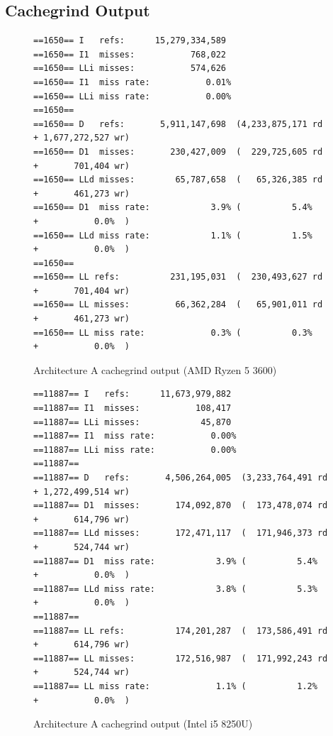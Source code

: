 \documentclass{article}
\begin{document}
\subsection{Cachegrind Output}
\begin{figure}[!h]
\centering
\begin{BVerbatim}
==1650== I   refs:      15,279,334,589
==1650== I1  misses:           768,022
==1650== LLi misses:           574,626
==1650== I1  miss rate:           0.01%
==1650== LLi miss rate:           0.00%
==1650== 
==1650== D   refs:       5,911,147,698  (4,233,875,171 rd   + 1,677,272,527 wr)
==1650== D1  misses:       230,427,009  (  229,725,605 rd   +       701,404 wr)
==1650== LLd misses:        65,787,658  (   65,326,385 rd   +       461,273 wr)
==1650== D1  miss rate:            3.9% (          5.4%     +           0.0%  )
==1650== LLd miss rate:            1.1% (          1.5%     +           0.0%  )
==1650== 
==1650== LL refs:          231,195,031  (  230,493,627 rd   +       701,404 wr)
==1650== LL misses:         66,362,284  (   65,901,011 rd   +       461,273 wr)
==1650== LL miss rate:             0.3% (          0.3%     +           0.0%  )
\end{BVerbatim}
\caption{Architecture A cachegrind output (AMD Ryzen 5 3600)}
\label{arch_a_cachegrind_pc}
\end{figure}

\begin{figure}[!h]
\centering
\begin{BVerbatim}
==11887== I   refs:      11,673,979,882
==11887== I1  misses:           108,417
==11887== LLi misses:            45,870
==11887== I1  miss rate:           0.00%
==11887== LLi miss rate:           0.00%
==11887== 
==11887== D   refs:       4,506,264,005  (3,233,764,491 rd   + 1,272,499,514 wr)
==11887== D1  misses:       174,092,870  (  173,478,074 rd   +       614,796 wr)
==11887== LLd misses:       172,471,117  (  171,946,373 rd   +       524,744 wr)
==11887== D1  miss rate:            3.9% (          5.4%     +           0.0%  )
==11887== LLd miss rate:            3.8% (          5.3%     +           0.0%  )
==11887== 
==11887== LL refs:          174,201,287  (  173,586,491 rd   +       614,796 wr)
==11887== LL misses:        172,516,987  (  171,992,243 rd   +       524,744 wr)
==11887== LL miss rate:             1.1% (          1.2%     +           0.0%  )
\end{BVerbatim}
\caption{Architecture A cachegrind output (Intel i5 8250U)}
\label{arch_a_cachegrind_laptop}
\end{figure}
\end{document}
